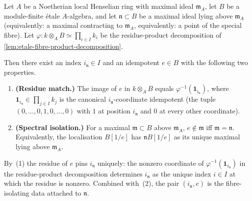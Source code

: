 \begin{lemma}
\label{lem:etale-isolating-idempotent-fibre}
Let $A$ be a Noetherian local Henselian ring with maximal ideal
$\mathfrak m_A$, let $B$ be a module-finite étale $A$-algebra,
and let $\mathfrak n \subset B$ be a maximal ideal lying above
$\mathfrak m_A$ (equivalently: a maximal contracting to
$\mathfrak m_A$, equivalently: a point of the special fibre).
Let
$\varphi : k \otimes_A B \simeq \prod_{i \in I} k_i$ be the
residue-product decomposition of
\cref{lem:etale-fibre-product-decomposition}.

Then there exist an index $i_{\mathfrak n} \in I$ and an
idempotent $e \in B$ with the following two properties.

\begin{enumerate}
\item \textbf{(Residue match.)} The image of $e$ in
  $k \otimes_A B$ equals
  $\varphi^{-1}(\mathbf 1_{i_{\mathfrak n}})$, where
  $\mathbf 1_{i_{\mathfrak n}} \in \prod_{j \in I} k_j$ is the
  canonical $i_{\mathfrak n}$-coordinate idempotent (the tuple
  $(0,\dots,0,1,0,\dots,0)$ with $1$ at position
  $i_{\mathfrak n}$ and $0$ at every other coordinate).
\item \textbf{(Spectral isolation.)} For a maximal
  $\mathfrak m \subset B$ above $\mathfrak m_A$, $e \notin
  \mathfrak m$ iff $\mathfrak m = \mathfrak n$. Equivalently, the
  localisation $B[1/e]$ has $\mathfrak n B[1/e]$ as its unique
  maximal lying above $\mathfrak m_A$.
\end{enumerate}

By~(1) the residue of $e$ pins $i_{\mathfrak n}$ uniquely: the
nonzero coordinate of $\varphi^{-1}(\mathbf 1_{i_{\mathfrak n}})$
in the residue-product decomposition determines $i_{\mathfrak n}$
as the unique index $i \in I$ at which the residue is nonzero.
Combined with~(2), the pair $(i_{\mathfrak n}, e)$ is the
fibre-isolating data attached to $\mathfrak n$.
\end{lemma}

